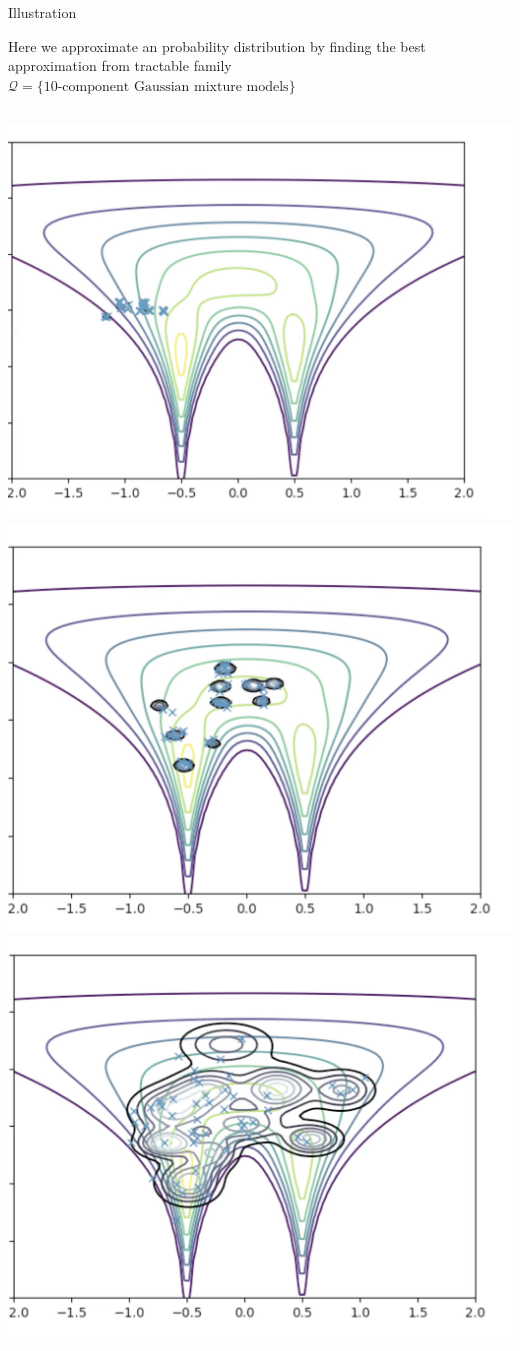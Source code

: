 \documentclass[10pt]{beamer}
\newcommand{\+}[1]{\ensuremath{{\boldsymbol #1}}} %
\newcommand{\Q}{\mathcal{Q}}
\begin{document}
\begin{frame}{Illustration}

 \begin{minipage}[t][.9\textheight]{\textwidth}
  
Here we approximate an probability distribution by finding the best approximation from tractable family $\Q = \{ \text{10-component Gaussian mixture models} \}$ 

\begin{columns}[t]
\centering
\includegraphics[width=.7\textwidth]{images/intro_animation_1.png}\\
\includegraphics[width=.7\textwidth]{images/intro_animation_2.png}
\centering
\includegraphics[width=.7\textwidth]{images/intro_animation_3.png}\\

\end{columns}
\end{minipage}
\end{frame}
\end{document}
